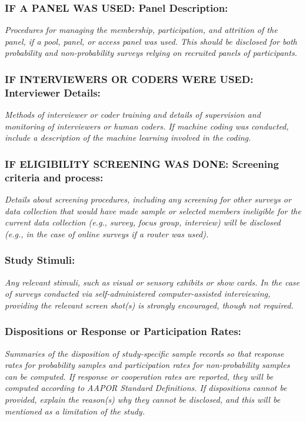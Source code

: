 \documentclass{article}
\begin{document}
\subsubsection*{IF A PANEL WAS USED: Panel Description:} \textit{Procedures for
    managing the membership, participation, and attrition of the panel, if a pool,
    panel, or access panel was used. This should be disclosed for both probability
    and non-probability surveys relying on recruited panels of participants.}

\subsubsection*{IF INTERVIEWERS OR CODERS WERE USED: Interviewer Details:}
\textit{Methods of interviewer or coder training and details of supervision and
    monitoring of interviewers or human coders. If machine coding was conducted,
    include a description of the machine learning involved in the coding.}

\subsubsection*{IF ELIGIBILITY SCREENING WAS DONE: Screening criteria and
    process:} \textit{Details about screening procedures, including any screening
    for other surveys or data collection that would have made sample or selected
    members ineligible for the current data collection (e.g., survey, focus group,
    interview) will be disclosed (e.g., in the case of online surveys if a router
    was used).}

\subsubsection*{Study Stimuli:} \textit{Any relevant stimuli, such as visual or
    sensory exhibits or show cards. In the case of surveys conducted via
    self-administered computer-assisted interviewing, providing the relevant screen
    shot(s) is strongly encouraged, though not required.}

\subsubsection*{Dispositions or Response or Participation Rates:}
\textit{Summaries of the disposition of study-specific sample records so that
    response rates for probability samples and participation rates for
    non-probability samples can be computed. If response or cooperation rates are
    reported, they will be computed according to AAPOR Standard Definitions. If
    dispositions cannot be provided, explain the reason(s) why they cannot be
    disclosed, and this will be mentioned as a limitation of the study.}
\end{document}
